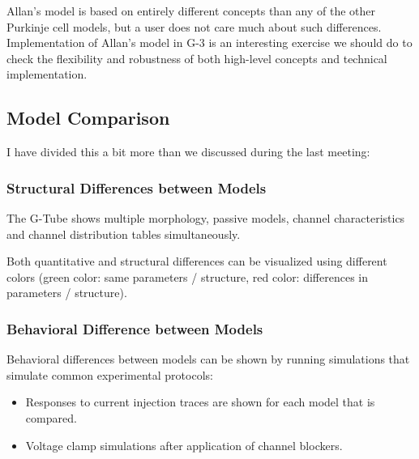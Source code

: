 \documentclass[12pt]{article}
\begin{document}
Allan's model is based on entirely different concepts than any of the
other Purkinje cell models, but a user does not care much about such
differences.  Implementation of Allan's model in G-3 is an interesting
exercise we should do to check the flexibility and robustness of both
high-level concepts and technical implementation.


\subsection{Model Comparison}

I have divided this a bit more than we discussed during the last
meeting:

\subsubsection{Structural Differences between Models}

The G-Tube shows multiple morphology, passive models, channel
characteristics and channel distribution tables simultaneously.

Both quantitative and structural differences can be visualized using
different colors (green color: same parameters / structure, red color:
differences in parameters / structure).

\subsubsection{Behavioral Difference between Models}

Behavioral differences between models can be shown by running
simulations that simulate common experimental protocols:

\begin{itemize}
\item Responses to current injection traces are shown for each model
  that is compared.
\item Voltage clamp simulations after application of channel blockers.
\end{itemize}
\end{document}
